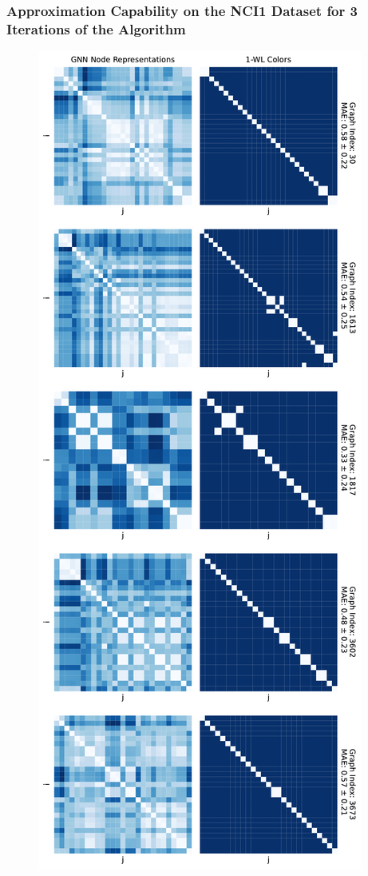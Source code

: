 \subsubsection{Approximation Capability on the NCI1 Dataset for 3 Iterations of the \wl Algorithm}
\begin{figure}[H]
    \centering
    \begin{minipage}[b]{0.45992852703\textwidth}
        \centering
        \includegraphics[width=\textwidth, left]{Figures/heatmaps_NCI1_0.pdf}

\end{minipage}
\end{figure}

